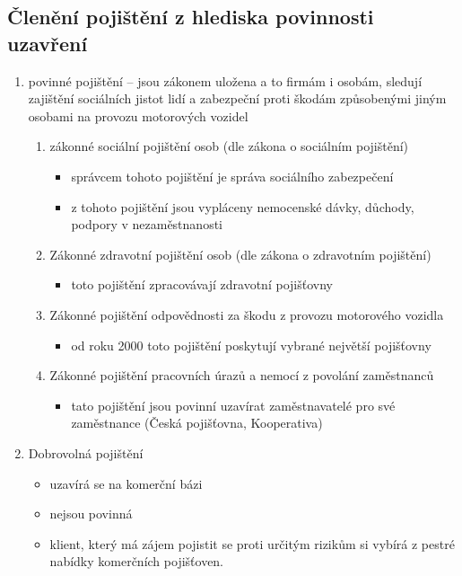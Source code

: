 \subsection*{Členění pojištění z hlediska povinnosti uzavření}
\begin{enumerate}
    \item povinné pojištění -- jsou zákonem uložena a to firmám i osobám, sledují zajištění sociálních jistot lidí a zabezpeční proti škodám způsobenými jiným osobami na provozu motorových vozidel
        \begin{enumerate}
            \item zákonné sociální pojištění osob (dle zákona o sociálním pojištění)
                \begin{itemize}
                    \item správcem tohoto pojištění je správa sociálního zabezpečení                    
                    \item z tohoto pojištění jsou vypláceny nemocenské dávky, důchody, podpory v nezaměstnanosti
                \end{itemize}
            \item Zákonné zdravotní pojištění osob (dle zákona o zdravotním pojištění)
                \begin{itemize}
                    \item toto pojištění zpracovávají zdravotní pojišťovny
                \end{itemize}
            \item Zákonné pojištění odpovědnosti za škodu z provozu motorového vozidla
                \begin{itemize}
                    \item od roku 2000 toto pojištění poskytují vybrané největší pojišťovny
                \end{itemize}            
            \item Zákonné pojištění pracovních úrazů a nemocí z povolání zaměstnanců
                \begin{itemize}
                    \item tato pojištění jsou povinní uzavírat zaměstnavatelé pro své zaměstnance (Česká pojišťovna, Kooperativa)
                \end{itemize}            
        \end{enumerate}
    \item Dobrovolná pojištění
        \begin{itemize}
            \item uzavírá se na komerční bázi
            \item nejsou povinná
            \item klient, který má zájem pojistit se proti určitým rizikům si vybírá z pestré nabídky komerčních pojišťoven.
        \end{itemize}
\end{enumerate}

